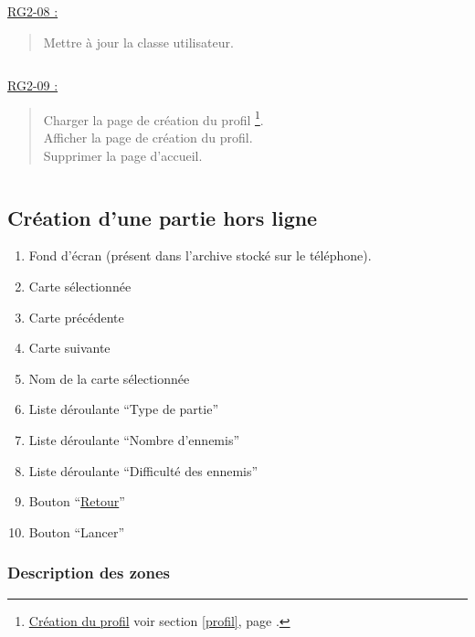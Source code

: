 \documentclass{report}
\begin{document}
		\underline{RG2-08 :}
			\begin{quote}
				Mettre à jour la classe utilisateur.
			\end{quote}

		$\,$

		\underline{RG2-09 :}
			\begin{quote}
				Charger la page de création du profil%
					\footnote{
						\hyperlink{profil}{Création du profil}
						\og voir section \ref{profil}, page \pageref{profil}.\fg
					}.\\
				Afficher la page de création du profil\footnotemark[9].\\
				Supprimer la page d'accueil\footnotemark[2].
			\end{quote}

		$\,$
	
\newpage

	\subsection{Création d'une partie hors ligne}
	
		\hypertarget{Creer partie solo}{}
		\label{Creer partie solo}

		\begin{center}
					
		\end{center}
		
		\begin{enumerate}
		  \item Fond d'écran (présent dans l'archive stocké sur le téléphone).
		  \item Carte sélectionnée
		  \item Carte précédente
		  \item Carte suivante
		  \item Nom de la carte sélectionnée
		  \item Liste déroulante ``Type de partie''
		  \item Liste déroulante ``Nombre d'ennemis''
		  \item Liste déroulante ``Difficulté des ennemis''
		  \item Bouton ``\hyperlink{Accueil}{Retour}''
		  \item Bouton ``Lancer'' 
		\end{enumerate}
		
		\subsubsection{Description des zones}
		
\end{document}
